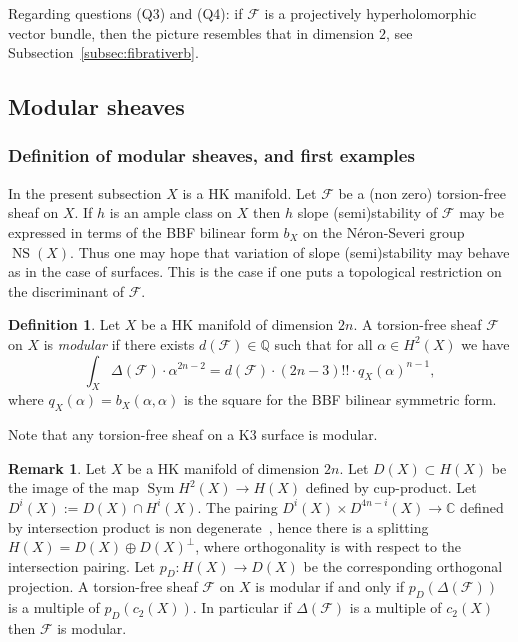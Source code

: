 \documentclass[11pt]{amsart}
\newcommand{\CC}{{\mathbb C}}
\newcommand{\QQ}{{\mathbb Q}}
\let\mathcal\mathscr
\def\cF{\mathcal{F}}
\DeclareMathOperator{\NS}{NS}
\DeclareMathOperator{\Sym}{Sym}
\theoremstyle{definition}
\newtheorem{dfn}[lmm]{Definition}
\newtheorem{rmk}[lmm]{Remark}
\theoremstyle{remark}
\begin{document}
Regarding questions (Q3) and (Q4): if $\cF$ is a projectively hyperholomorphic vector bundle, then the picture resembles that in dimension $2$,  see Subsection~\ref{subsec:fibrativerb}.
%
\subsection{Modular  sheaves}
%
%
\setcounter{equation}{0}
%
%
\subsubsection{Definition of modular sheaves, and first examples}
%
In the present subsection $X$ is a HK manifold. Let $\cF$ be a (non zero) torsion-free sheaf on $X$. If $h$ is an ample class on $X$ then $h$ slope (semi)stability of $\cF$ may be expressed in terms of the BBF bilinear form $b_X$ on the   N\'eron-Severi group $\NS(X)$. Thus one may hope that variation of slope (semi)stability may behave as in the case of surfaces. This is  the case if one puts a topological restriction on the discriminant of  $\cF$.  
%
\begin{dfn}\label{dfn:effemod}
%
Let $X$ be a HK manifold of dimension $2n$. A torsion-free sheaf $\cF$ on $X$ is \emph{modular} if 
there exists $d(\cF)\in\QQ$ such that   for all $\alpha\in H^2(X)$ we have
%
\begin{equation}\label{fernand}
%
\int_X \Delta(\cF)\cdot \alpha^{2n-2}=d(\cF) \cdot (2n-3)!! \cdot q_X(\alpha)^{n-1},
%
\end{equation}
%
 where $q_X(\alpha)=b_X(\alpha,\alpha)$ is the square for the BBF bilinear symmetric form. 
%
\end{dfn}
%
Note that any torsion-free sheaf on a K3 surface is modular. 
%
\begin{rmk}\label{semphodge}
%
Let $X$ be a HK manifold of dimension $2n$. Let $D(X)\subset H(X)$  be the image of the map $\Sym H^2(X)\to H(X)$ defined by cup-product. Let $D^i(X):=D(X)\cap H^i(X)$. The  pairing $D^i(X)\times D^{4n-i}(X)\to\CC$ defined by intersection product is non degenerate~\cite{verbcohk,bogcohk,rhag}, hence there is a splitting $H(X)= D(X)\oplus D(X)^{\bot}$, where orthogonality is with respect to the intersection pairing. Let $p_D\colon H(X)\to D(X)$ be the corresponding orthogonal projection. 
A torsion-free sheaf  $\cF$ on $X$ is modular if and only if  $p_D(\Delta(\cF))$  is a multiple of $p_D(c_2(X))$.
In particular if  $\Delta(\cF)$ is a multiple of $c_2(X)$ then $\cF$ is modular. 
%
\end{rmk}
%
%
\end{document}
